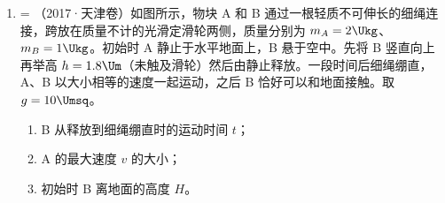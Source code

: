 \documentclass[\gkver]{gaokaozhenti}
\makeatletter
\newcommand{\tiinfo}[2]{{\small\color{gray}（#1）\textcolor{orange!85!black}{\nandu{#2}}}\hspace{0.4em}}
\newenvironment{tibody}
  {\begin{minipage}[t]{\linewidth}\@listdepth=\@ne\leavevmode\ignorespaces}
  {\end{minipage}}
\makeatother
\begin{document}
\begin{enumerate}[resume=tiku]
{	$v_{3}=0.2\Ums$

	然后乙做减速运动，当速度减为零时则

	$x=\frac{v_{3}^{2}}{2a}=\frac{0.2^{2}}{2\times1}\Um=0.02\Um=s_{2}$

	可知乙恰好能滑到边框 a；

	（2）甲与乙碰前运动的时间

	$t_{1}=\frac{v_{0}-v_{1}}{a}=\frac{0.4-0.3}{1}\Us=0.1\Us$

	碰后甲运动的时间

	$t_{2}=\frac{v_{2}}{a}=\frac{0.1}{1}\Us=0.1\Us$

	则甲运动的总时间为

	$t=t_{1}+t_{2}=0.2\Us$
}

\item
\begin{tibody}
\tiinfo{2017·天津卷}{2}如图所示，物块 A 和 B 通过一根轻质不可伸长的细绳连接，跨放在质量不计的光滑定滑轮两侧，质量分别为 $m_{A}=2 \Ukg$、$m_{B}=1 \Ukg$。初始时 A 静止于水平地面上，B 悬于空中。先将 B 竖直向上再举高 $h=1.8 \Um$（未触及滑轮）然后由静止释放。一段时间后细绳绷直，A、B 以大小相等的速度一起运动，之后 B 恰好可以和地面接触。取 $g=10 \Umsq$。

\begin{enumerate}
	\item
	B 从释放到细绳绷直时的运动时间 $t$；
	\item
	A 的最大速度 $v$ 的大小；
	\item
	初始时 B 离地面的高度 $H$。
\end{enumerate}
\onepicture[h=4.4cm, align=right]{}
\end{tibody}

\end{enumerate}
\end{document}
